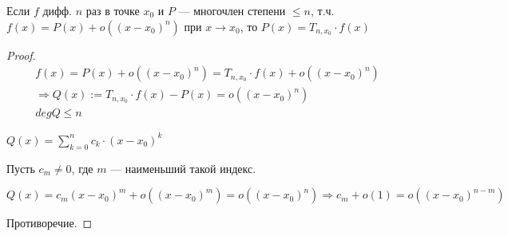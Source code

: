 \begin{follow}
    Если $f$ дифф. $n$ раз в точке $x_0$ и $P$ --- многочлен степени $\leqslant n$, т.ч.
    $f(x) = P(x) + o((x - x_0)^n)$ при $x \rightarrow x_0$, то $P(x) = T_{n,x_0} \cdot f(x)$

    \begin{proof}
        
        \begin{gather*}
            f(x) = P(x) + o((x - x_0)^n) = T_{n,x_0} \cdot f(x) + o((x - x_0)^n)  \\
            \Longrightarrow Q(x) := T_{n, x_0} \cdot f(x) - P(x) = o((x - x_0)^n) \\
            deg Q \leqslant n
        \end{gather*}

        $Q(x) = \sum_{k = 0}^{n} c_k \cdot (x - x_0)^k $
        
        Пусть $c_m \neq 0$, где $m$ --- наименьший такой индекс.

        $Q(x) = c_m(x - x_0)^m + o((x - x_0)^m) = o((x - x_0)^n) \Longrightarrow c_m + o(1) = o((x - x_0)^{n - m})$

        Противоречие.

    \end{proof}
\end{follow}